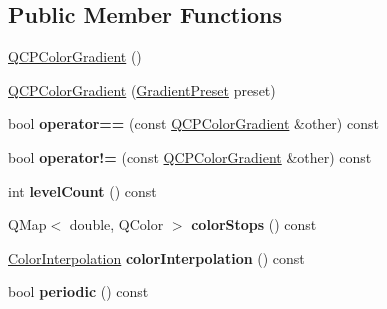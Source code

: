 \subsection*{Public Member Functions}
\begin{DoxyCompactItemize}
\item 
\hyperlink{classQCPColorGradient_a96bcc490ff9dc32b22941ce00800bce0}{Q\+C\+P\+Color\+Gradient} ()
\item 
\hyperlink{classQCPColorGradient_a4e570b4004fd60bd135e52d685ed2b66}{Q\+C\+P\+Color\+Gradient} (\hyperlink{classQCPColorGradient_aed6569828fee337023670272910c9072}{Gradient\+Preset} preset)
\item 
bool {\bfseries operator==} (const \hyperlink{classQCPColorGradient}{Q\+C\+P\+Color\+Gradient} \&other) const \hypertarget{classQCPColorGradient_aada47d8206bf2cec77462653bf471c13}{}\label{classQCPColorGradient_aada47d8206bf2cec77462653bf471c13}

\item 
bool {\bfseries operator!=} (const \hyperlink{classQCPColorGradient}{Q\+C\+P\+Color\+Gradient} \&other) const \hypertarget{classQCPColorGradient_ac641f5d2dc1686201d3cb602c871791d}{}\label{classQCPColorGradient_ac641f5d2dc1686201d3cb602c871791d}

\item 
int {\bfseries level\+Count} () const \hypertarget{classQCPColorGradient_ae7537a8e6d0fed3f1928328062bb0f4e}{}\label{classQCPColorGradient_ae7537a8e6d0fed3f1928328062bb0f4e}

\item 
Q\+Map$<$ double, Q\+Color $>$ {\bfseries color\+Stops} () const \hypertarget{classQCPColorGradient_a64f8aba7826f9c6363aacff8376cef37}{}\label{classQCPColorGradient_a64f8aba7826f9c6363aacff8376cef37}

\item 
\hyperlink{classQCPColorGradient_ac5dca17cc24336e6ca176610e7f77fc1}{Color\+Interpolation} {\bfseries color\+Interpolation} () const \hypertarget{classQCPColorGradient_a731616fabe6f2e33f71f58dd382359d8}{}\label{classQCPColorGradient_a731616fabe6f2e33f71f58dd382359d8}

\item 
bool {\bfseries periodic} () const \hypertarget{classQCPColorGradient_a860b7048f877195d2a0fb8d5a7cf5d73}{}\label{classQCPColorGradient_a860b7048f877195d2a0fb8d5a7cf5d73}


\end{DoxyCompactItemize}
